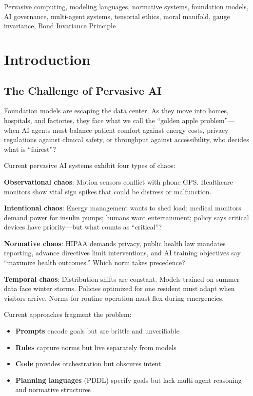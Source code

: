 \documentclass[conference]{IEEEtran}
\begin{document}
\begin{IEEEkeywords}
Pervasive computing, modeling languages, normative systems, foundation models, AI governance, multi-agent systems, tensorial ethics, moral manifold, gauge invariance, Bond Invariance Principle
\end{IEEEkeywords}

\section{Introduction}
\label{sec:introduction}

\subsection{The Challenge of Pervasive AI}

Foundation models are escaping the data center. As they move into homes,
hospitals, and factories, they face what we call the ``golden apple
problem''---when AI agents must balance patient comfort against energy
costs, privacy regulations against clinical safety, or throughput
against accessibility, who decides what is ``fairest''?

Current pervasive AI systems exhibit four types of chaos:

\textbf{Observational chaos}: Motion sensors conflict with phone GPS.
Healthcare monitors show vital sign spikes that could be distress or
malfunction.

\textbf{Intentional chaos}: Energy management wants to shed load;
medical monitors demand power for insulin pumps; humans want
entertainment; policy says critical devices have priority---but what
counts as ``critical''?

\textbf{Normative chaos}: HIPAA demands privacy, public health law
mandates reporting, advance directives limit interventions, and AI
training objectives say ``maximize health outcomes.'' Which norm takes
precedence?

\textbf{Temporal chaos}: Distribution shifts are constant. Models
trained on summer data face winter storms. Policies optimized for one
resident must adapt when visitors arrive. Norms for routine operation
must flex during emergencies.

Current approaches fragment the problem:
\begin{itemize}
\item \textbf{Prompts} encode goals but are brittle and unverifiable
\item \textbf{Rules} capture norms but live separately from models
\item \textbf{Code} provides orchestration but obscures intent
\item \textbf{Planning languages} (PDDL) specify goals but lack multi-agent reasoning and normative structures
\end{itemize}
\end{document}
